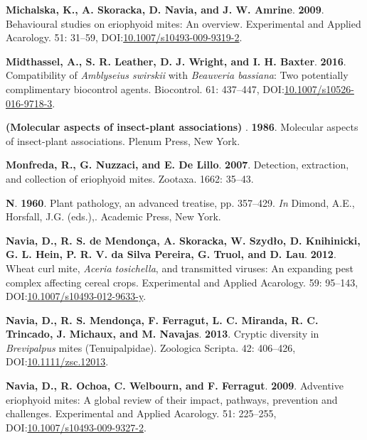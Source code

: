\documentclass[12pt,final,CPage]{ufthesis}
\newlength{\cslhangindent}
\newenvironment{CSLReferences}[2] %
{%
	\setlength{\parindent}{0pt}
	\ifodd #1 \everypar{\setlength{\hangindent}{\cslhangindent}}\ignorespaces\fi
	\ifnum #2 > 0
	\setlength{\parskip}{#2\baselineskip}
	\fi
}%
{}
\begin{document}
{\begin{CSLReferences}{1}{0}
  \leavevmode{}%
  \textbf{Michalska, K., A. Skoracka, D. Navia, and J. W. Amrine}. \textbf{2009}. Behavioural studies on eriophyoid mites: An overview. Experimental and Applied Acarology. 51: 31--59, DOI:\href{https://doi.org/10.1007/s10493-009-9319-2}{10.1007/s10493-009-9319-2}.

  \leavevmode{}%
  \textbf{Midthassel, A., S. R. Leather, D. J. Wright, and I. H. Baxter}. \textbf{2016}. Compatibility of {\emph{Amblyseius swirskii}} with {\emph{Beauveria bassiana}}: Two potentially complimentary biocontrol agents. Biocontrol. 61: 437--447, DOI:\href{https://doi.org/10.1007/s10526-016-9718-3}{10.1007/s10526-016-9718-3}.

  \leavevmode{}%
  \textbf{(Molecular aspects of insect-plant associations) }. \textbf{1986}. Molecular aspects of insect-plant associations. Plenum Press, New York.

  \leavevmode{}%
  \textbf{Monfreda, R., G. Nuzzaci, and E. De Lillo}. \textbf{2007}. Detection, extraction, and collection of eriophyoid mites. Zootaxa. 1662: 35--43.

  \leavevmode{}%
  \textbf{N}. \textbf{1960}. Plant pathology, an advanced treatise, pp. 357--429. \emph{In} Dimond, A.E., Horsfall, J.G. (eds.),. Academic Press, New York.

  \leavevmode{}%
  \textbf{Navia, D., R. S. de Mendonça, A. Skoracka, W. Szydło, D. Knihinicki, G. L. Hein, P. R. V. da Silva Pereira, G. Truol, and D. Lau}. \textbf{2012}. {Wheat curl mite}, {\emph{Aceria tosichella}}, and transmitted viruses: An expanding pest complex affecting cereal crops. Experimental and Applied Acarology. 59: 95--143, DOI:\href{https://doi.org/10.1007/s10493-012-9633-y}{10.1007/s10493-012-9633-y}.

  \leavevmode{}%
  \textbf{Navia, D., R. S. Mendonça, F. Ferragut, L. C. Miranda, R. C. Trincado, J. Michaux, and M. Navajas}. \textbf{2013}. Cryptic diversity in {\emph{Brevipalpus}} mites ({Tenuipalpidae}). Zoologica Scripta. 42: 406--426, DOI:\href{https://doi.org/10.1111/zsc.12013}{10.1111/zsc.12013}.

  \leavevmode{}%
  \textbf{Navia, D., R. Ochoa, C. Welbourn, and F. Ferragut}. \textbf{2009}. Adventive eriophyoid mites: A global review of their impact, pathways, prevention and challenges. Experimental and Applied Acarology. 51: 225--255, DOI:\href{https://doi.org/10.1007/s10493-009-9327-2}{10.1007/s10493-009-9327-2}.


\end{CSLReferences}}
\end{document}
